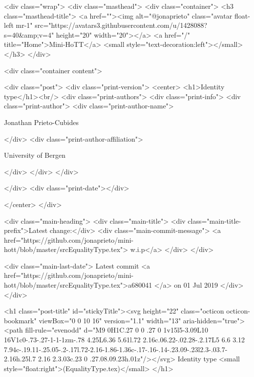     <div class="wrap">
      <div class="masthead">
        <div class="container">
          <h3 class="masthead-title">
            <a href=""><img alt="@jonaprieto" class="avatar float-left mr-1" src="https://avatars3.githubusercontent.com/u/1428088?s=40&amp;v=4" height="20" width="20"></a>
            <a href="/" title="Home">Mini-HoTT</a>
            <small style="text-decoration:left"></small>
          </h3>
        </div>
      
      <div class="container content">
        







<div class="post">
  <div class="print-version">
    <center>
      <h1>Identity type</h1><br/>
        <div class="print-authors">
          <div class="print-info">
            <div class="print-author">
              <div class="print-author-name">
                
                  Jonathan Prieto-Cubides
                
              </div>
              <div class="print-author-affiliation">
                
                  University of Bergen
                
                </div>
            </div>
          </div>
          
          
        </div>
        <div class="print-date"></div>
        
        
    </center>
  </div>

  
  <div class="main-heading">
    <div class="main-title">
      <div class="main-title-prefix">Latest change:</div>
      <div class="main-commit-message">
            <a href="https://github.com/jonaprieto/mini-hott/blob/master/srcEqualityType.tex">
              w.i.p</a>
      </div>
    </div>

    <div class="main-last-date">
      Latest commit <a href="https://github.com/jonaprieto/mini-hott/blob/master/srcEqualityType.tex">a680041 </a> on  01 Jul 2019
    </div>
  </div>
  

  <h1 class="post-title" id="stickyTitle"><svg height="22" class="octicon octicon-bookmark" viewBox="0 0 10 16" version="1.1" width="13" aria-hidden="true"><path fill-rule="evenodd" d="M9 0H1C.27 0 0 .27 0 1v15l5-3.09L10 16V1c0-.73-.27-1-1-1zm-.78 4.25L6.36 5.61l.72 2.16c.06.22-.02.28-.2.17L5 6.6 3.12 7.94c-.19.11-.25.05-.2-.17l.72-2.16-1.86-1.36c-.17-.16-.14-.23.09-.23l2.3-.03.7-2.16h.25l.7 2.16 2.3.03c.23 0 .27.08.09.23h.01z"/></svg> Identity type <small style="float:right">(EqualityType.tex)</small>
  </h1>

